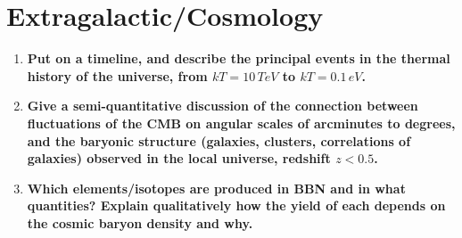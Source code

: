 \documentclass[12pt, letterpaper, preprint]{aastex}
\begin{document}
\section*{Extragalactic/Cosmology}

\begin{enumerate}

\item \textbf{Put on a timeline, and describe the principal events in the
thermal history of the universe, from $kT=10\,TeV$ to $kT = 0.1\,eV$.}

\item \textbf{Give a semi-quantitative discussion of the connection between fluctuations of the CMB on angular scales of arcminutes to degrees, and the baryonic structure (galaxies, clusters, correlations of galaxies) observed in the local universe, redshift $z < 0.5$.}

\item \textbf{Which elements/isotopes are produced in BBN and in what quantities? Explain qualitatively how the yield of each depends on the cosmic baryon density and why.}

\end{enumerate}
\end{document}
